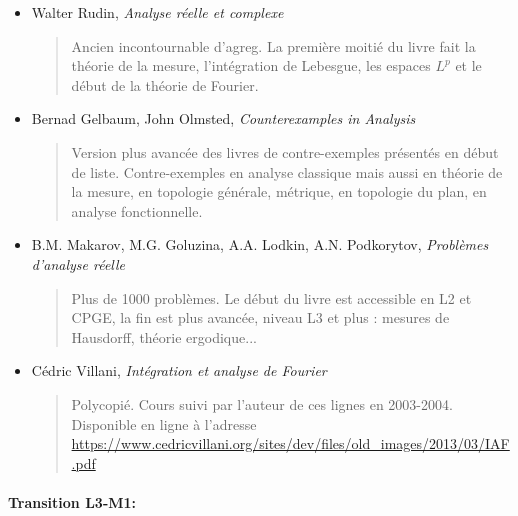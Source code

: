 \documentclass{article}
\begin{document}
\begin{itemize}
\item Walter Rudin, \emph{Analyse réelle et complexe}
\begin{quote}
Ancien incontournable d'agreg. La première moitié du livre fait la théorie de la mesure,  l'intégration de Lebesgue, les espaces $L^p$ et le début de la théorie de Fourier.
\end{quote}
\item Bernad Gelbaum, John Olmsted, \emph{Counterexamples in Analysis}
\begin{quote}
Version plus avancée des livres de contre-exemples présentés en début de liste. Contre-exemples en analyse classique mais aussi en théorie de la mesure, en topologie générale, métrique, en topologie du plan, en analyse fonctionnelle.
\end{quote}
\item B.M. Makarov, M.G. Goluzina, A.A. Lodkin, A.N. Podkorytov, \emph{Problèmes d'analyse réelle}
\begin{quote}
Plus de 1000 problèmes. Le début du livre est accessible en L2 et CPGE, la fin est plus avancée, niveau L3 et plus : mesures de Hausdorff, théorie ergodique...
\end{quote}
\item Cédric Villani, \emph{Intégration et analyse de Fourier}
\begin{quote}
Polycopié. Cours suivi par l'auteur de ces lignes en 2003-2004. Disponible en ligne à l'adresse \url{https://www.cedricvillani.org/sites/dev/files/old_images/2013/03/IAF.pdf}
\end{quote}
\end{itemize}

\paragraph{Transition L3-M1:}
\end{document}
